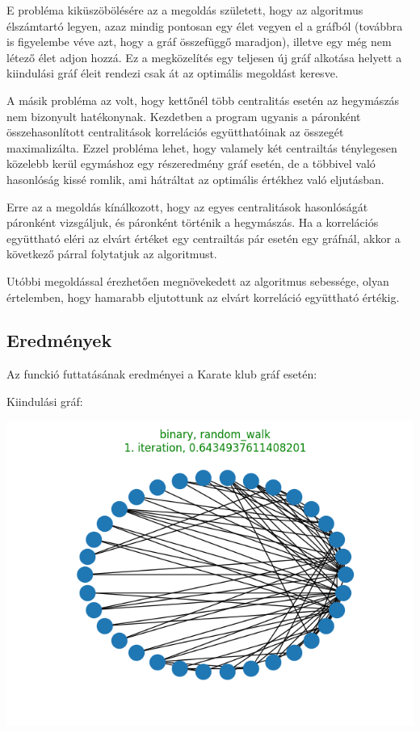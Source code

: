 \documentclass[12pt,numbers=noenddot]{report}
\begin{document}
E probléma kiküszöbölésére az a megoldás született, hogy az algoritmus 
élszámtartó legyen, azaz mindig pontosan egy élet vegyen el a gráfból 
(továbbra is figyelembe véve azt, hogy a gráf összefüggő maradjon), illetve egy 
még nem létező élet adjon hozzá. Ez a megközelítés egy teljesen új gráf alkotása
helyett a kiindulási gráf éleit rendezi csak át az optimális megoldást keresve.

A másik probléma az volt, hogy kettőnél több centralitás esetén az 
hegymászás nem bizonyult hatékonynak. Kezdetben a program ugyanis a páronként 
összehasonlított centralitások korrelációs együtthatóinak az összegét 
maximalizálta. Ezzel probléma lehet, hogy valamely két centrailtás ténylegesen
közelebb kerül egymáshoz egy részeredmény gráf esetén, de a többivel való
hasonlóság kissé romlik, ami hátráltat az optimális értékhez való eljutásban.

Erre az a megoldás kínálkozott, hogy az egyes centralitások hasonlóságát 
páronként vizsgáljuk, és páronként történik a hegymászás. Ha a korrelációs
együttható eléri az elvárt értéket egy centrailtás pár esetén egy gráfnál,
akkor a következő párral folytatjuk az algoritmust.

Utóbbi megoldással érezhetően megnövekedett az algoritmus sebessége, olyan 
értelemben, hogy hamarabb eljutottunk az elvárt korreláció együttható értékig.

\pagebreak

\subsection{Eredmények}

Az funckió futtatásának eredményei a Karate klub gráf esetén:

\noindent
Kiindulási gráf:

\includegraphics[width=0.85\linewidth]{images/find_similar_start.png}
\end{document}
